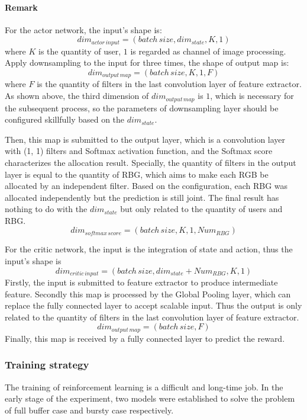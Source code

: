 \documentclass{article}
\begin{document}
\paragraph{Remark}
For the actor network, the input's shape is: 
$$ 
dim_{actor \, input}=(batch \, size, dim_{state}, K, 1)
$$
where $ K $ is the quantity of user, $ 1 $ is regarded as channel of image processing.
Apply downsampling to the input for three times, the shape of output map is: 
$$
dim_{output \, map}=(batch \, size, K, 1, F) 
$$
where $ F $ is the quantity of filters in the last convolution layer of feature extractor.
As shown above, the third dimension of $ dim_{output \, map} $ is $ 1 $, which is necessary for the subsequent process, 
so the parameters of downsampling layer should be configured skillfully based on the $ dim_{state} $.

Then, this map is submitted to the output layer, which is a convolution layer with (1, 1) filters and Softmax activation function, and 
the Softmax score characterizes the allocation result.
Specially, the quantity of filters in the output layer is equal to the quantity of RBG, which aims to make each RGB be allocated by
an independent filter.
Based on the configuration, each RBG was allocated independently but the prediction is still joint.
The final result has nothing to do with the $ dim_{state} $ but only related to the quantity of users and RBG.
$$
dim_{softmax \, score}=(batch \, size, K, 1, Num_{RBG})
$$

For the critic network, the input is the integration of state and action, thus the input's shape is 
$$ 
dim_{critic \, input}=(batch \, size, dim_{state}+Num_{RBG}, K, 1) 
$$
Firstly, the input is submitted to feature extractor to produce intermediate feature.
Secondly this map is processed by the Global Pooling layer, which can replace the fully connected layer to accept scalable input. \cite{Lin2013Network}
Thus the output is only related to the quantity of filters in the last convolution layer of feature extractor.
$$
dim_{output \, map}=(batch \, size, F) 
$$
Finally, this map is received by a fully connected layer to predict the reward.

\subsubsection{Training strategy}
The training of reinforcement learning is a difficult and long-time job.
In the early stage of the experiment, two models were established to solve the problem of full buffer case and bursty case respectively.
\end{document}
